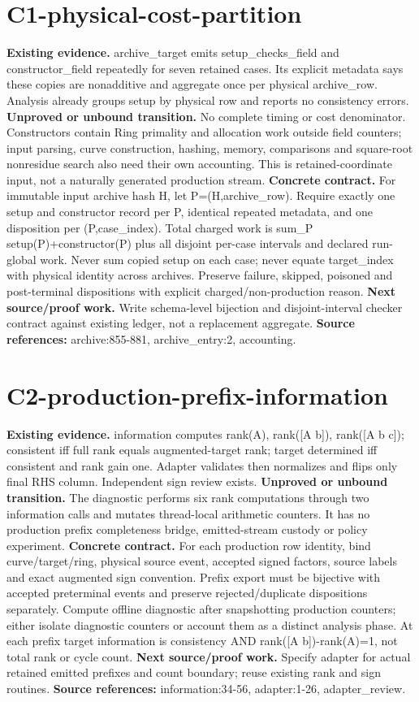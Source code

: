 \documentclass[10pt]{article}
\begin{document}
\section*{C1-physical-cost-partition}
\textbf{Existing evidence.} archive\_target emits setup\_checks\_field and constructor\_field repeatedly for seven retained cases. Its explicit metadata says these copies are nonadditive and aggregate once per physical archive\_row. Analysis already groups setup by physical row and reports no consistency errors.
\textbf{Unproved or unbound transition.} No complete timing or cost denominator. Constructors contain Ring primality and allocation work outside field counters; input parsing, curve construction, hashing, memory, comparisons and square-root nonresidue search also need their own accounting. This is retained-coordinate input, not a naturally generated production stream.
\textbf{Concrete contract.} For immutable input archive hash H, let P=(H,archive\_row). Require exactly one setup and constructor record per P, identical repeated metadata, and one disposition per (P,case\_index). Total charged work is sum\_P setup(P)+constructor(P) plus all disjoint per-case intervals and declared run-global work. Never sum copied setup on each case; never equate target\_index with physical identity across archives. Preserve failure, skipped, poisoned and post-terminal dispositions with explicit charged/non-production reason.
\textbf{Next source/proof work.} Write schema-level bijection and disjoint-interval checker contract against existing ledger, not a replacement aggregate.
\textbf{Source references:} archive:855-881, archive\_entry:2, accounting.
\section*{C2-production-prefix-information}
\textbf{Existing evidence.} information computes rank(A), rank([A b]), rank([A b c]); consistent iff full rank equals augmented-target rank; target determined iff consistent and rank gain one. Adapter validates then normalizes and flips only final RHS column. Independent sign review exists.
\textbf{Unproved or unbound transition.} The diagnostic performs six rank computations through two information calls and mutates thread-local arithmetic counters. It has no production prefix completeness bridge, emitted-stream custody or policy experiment.
\textbf{Concrete contract.} For each production row identity, bind curve/target/ring, physical source event, accepted signed factors, source labels and exact augmented sign convention. Prefix export must be bijective with accepted preterminal events and preserve rejected/duplicate dispositions separately. Compute offline diagnostic after snapshotting production counters; either isolate diagnostic counters or account them as a distinct analysis phase. At each prefix target information is consistency AND rank([A b])-rank(A)=1, not total rank or cycle count.
\textbf{Next source/proof work.} Specify adapter for actual retained emitted prefixes and count boundary; reuse existing rank and sign routines.
\textbf{Source references:} information:34-56, adapter:1-26, adapter\_review.
\newpage
\end{document}
